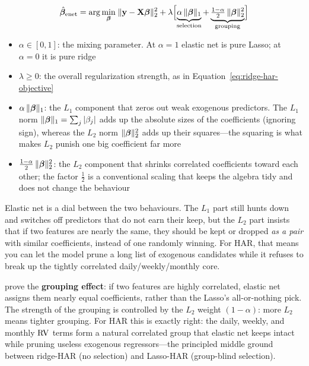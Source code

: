 \begin{equation}
  \hat{\bm{\beta}}_{\mathrm{enet}} = \arg\min_{\bm{\beta}}\;
  \lVert \mathbf{y} - \mathbf{X}\bm{\beta} \rVert_2^2
  + \lambda\Bigl[\underbrace{\alpha\,\lVert\bm{\beta}\rVert_1}_{\text{selection}}
  + \underbrace{\tfrac{1-\alpha}{2}\,\lVert\bm{\beta}\rVert_2^2}_{\text{grouping}}\Bigr]
  \label{eq:elastic-net-har}
\end{equation}
\begin{itemize}[nosep]
  \item $\alpha \in [0,1]$: the mixing parameter. At $\alpha = 1$ elastic net is pure Lasso; at $\alpha = 0$ it is pure ridge
  \item $\lambda \geq 0$: the overall regularization strength, as in Equation~\eqref{eq:ridge-har-objective}
  \item $\alpha\,\lVert\bm{\beta}\rVert_1$: the $L_1$ component that zeros out weak exogenous predictors. The $L_1$ norm $\lVert\bm{\beta}\rVert_1 = \sum_j|\beta_j|$ adds up the absolute sizes of the coefficients (ignoring sign), whereas the $L_2$ norm $\lVert\bm{\beta}\rVert_2^2$ adds up their squares---the squaring is what makes $L_2$ punish one big coefficient far more
  \item $\tfrac{1-\alpha}{2}\,\lVert\bm{\beta}\rVert_2^2$: the $L_2$ component that shrinks correlated coefficients toward each other; the factor $\tfrac{1}{2}$ is a conventional scaling that keeps the algebra tidy and does not change the behaviour
\end{itemize}

\begin{intuition}
Elastic net is a dial between the two behaviours.
The $L_1$ part still hunts down and switches off predictors that do not earn their keep, but the $L_2$ part insists that if two features are nearly the same, they should be kept or dropped \emph{as a pair} with similar coefficients, instead of one randomly winning.
For HAR, that means you can let the model prune a long list of exogenous candidates while it refuses to break up the tightly correlated daily/weekly/monthly core.
\end{intuition}

\begin{keyidea}
\citet{ZouHastie2005} prove the \textbf{grouping effect}: if two features are highly correlated, elastic net assigns them nearly equal coefficients, rather than the Lasso's all-or-nothing pick.
The strength of the grouping is controlled by the $L_2$ weight $(1-\alpha)$: more $L_2$ means tighter grouping.
For HAR this is exactly right: the daily, weekly, and monthly $\operatorname{RV}$ terms form a natural correlated group that elastic net keeps intact while pruning useless exogenous regressors---the principled middle ground between ridge-HAR (no selection) and Lasso-HAR (group-blind selection).
\end{keyidea}

